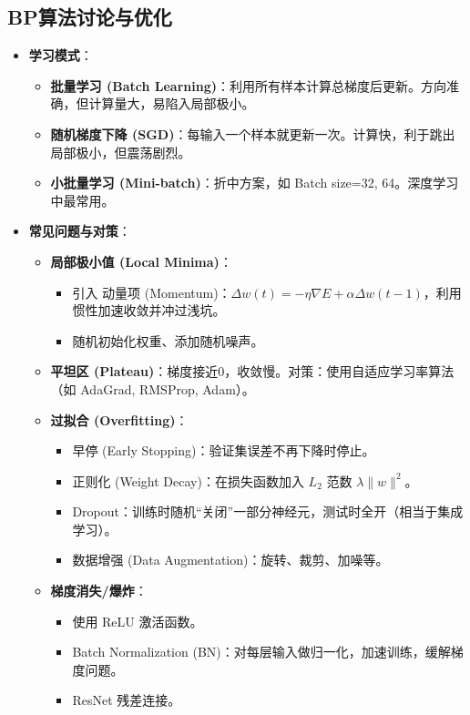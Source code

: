 \documentclass[a4paper, 11pt]{ctexart}
\begin{document}
\subsection{BP算法讨论与优化}
\begin{itemize}
    \item \textbf{学习模式}：
    \begin{itemize}
        \item \textbf{批量学习 (Batch Learning)}：利用所有样本计算总梯度后更新。方向准确，但计算量大，易陷入局部极小。
        \item \textbf{随机梯度下降 (SGD)}：每输入一个样本就更新一次。计算快，利于跳出局部极小，但震荡剧烈。
        \item \textbf{小批量学习 (Mini-batch)}：折中方案，如 Batch size=32, 64。深度学习中最常用。
    \end{itemize}
    \item \textbf{常见问题与对策}：
    \begin{itemize}
        \item \textbf{局部极小值 (Local Minima)}：
        \begin{itemize}
            \item 引入 动量项 (Momentum)：$\Delta w(t) = -\eta \nabla E + \alpha \Delta w(t-1)$，利用惯性加速收敛并冲过浅坑。
            \item 随机初始化权重、添加随机噪声。
        \end{itemize}
        \item \textbf{平坦区 (Plateau)}：梯度接近0，收敛慢。对策：使用自适应学习率算法（如 AdaGrad, RMSProp, Adam）。
        \item \textbf{过拟合 (Overfitting)}：
        \begin{itemize}
            \item 早停 (Early Stopping)：验证集误差不再下降时停止。
            \item 正则化 (Weight Decay)：在损失函数加入 $L_2$ 范数 $\lambda \|w\|^2$。
            \item Dropout：训练时随机“关闭”一部分神经元，测试时全开（相当于集成学习）。
            \item 数据增强 (Data Augmentation)：旋转、裁剪、加噪等。
        \end{itemize}
        \item \textbf{梯度消失/爆炸}：
        \begin{itemize}
            \item 使用 ReLU 激活函数。
            \item Batch Normalization (BN)：对每层输入做归一化，加速训练，缓解梯度问题。
            \item ResNet 残差连接。
        \end{itemize}
    \end{itemize}
\end{itemize}
\end{document}
